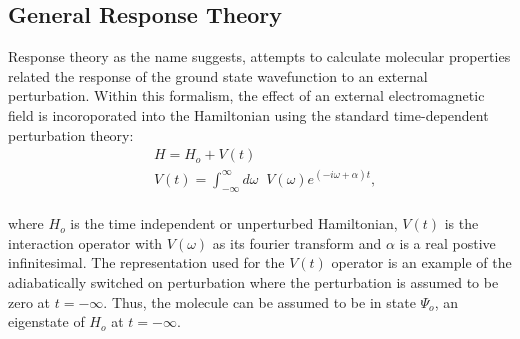 \subsection{General Response Theory}
Response theory as the name suggests, attempts to calculate molecular properties related 
the response of the ground state wavefunction to an external perturbation. Within this 
formalism, the effect of an external electromagnetic field is incoroporated into the 
Hamiltonian using the standard time-dependent perturbation theory:
\\
\begin{equation}
\begin{split}
& H = H_o + V(t)\\
&V(t) = \int_{-\infty}^{\infty}d\omega\;\;V(\omega) e^{(-i\omega + \alpha)t},
\end{split}
\end{equation}
\\
where $H_o$ is the time independent or unperturbed Hamiltonian, $V(t)$ is the interaction 
operator with $V(\omega)$ as its fourier transform and $\alpha$ is a real postive infinitesimal.
The representation used for the $V(t)$ operator is an example of the adiabatically 
switched on perturbation\cite{} where the perturbation is assumed to be zero at 
$t = -\infty$. Thus, the molecule can be assumed to be in state $\Psi_o$, an 
eigenstate of $H_o$ at $t = -\infty$.
